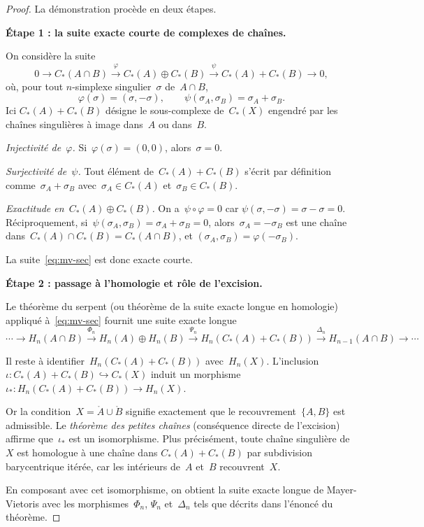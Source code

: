 \documentclass[12pt,a4paper,openany]{book}
\theoremstyle{definition}
\theoremstyle{plain}
\theoremstyle{remark}
\begin{document}
\begin{proof}
La démonstration procède en deux étapes.

\medskip
\noindent\textbf{Étape 1 : la suite exacte courte de complexes de chaînes.}

On considère la suite
\begin{equation}\label{eq:mv-sec}
  0 \longrightarrow C_*(A \cap B)
  \xrightarrow{\;\varphi\;} C_*(A) \oplus C_*(B)
  \xrightarrow{\;\psi\;} C_*(A) + C_*(B) \longrightarrow 0,
\end{equation}
où, pour tout $n$-simplexe singulier~$\sigma$ de~$A \cap B$,
\[
  \varphi(\sigma) = (\sigma, -\sigma),
  \qquad
  \psi(\sigma_A, \sigma_B) = \sigma_A + \sigma_B.
\]
Ici $C_*(A) + C_*(B)$ désigne le sous-complexe de~$C_*(X)$ engendré par les chaînes
singulières à image dans~$A$ ou dans~$B$.

\emph{Injectivité de~$\varphi$.} Si~$\varphi(\sigma) = (0, 0)$, alors~$\sigma = 0$.

\emph{Surjectivité de~$\psi$.} Tout élément de~$C_*(A) + C_*(B)$ s'écrit par
définition comme~$\sigma_A + \sigma_B$ avec~$\sigma_A \in C_*(A)$ et~$\sigma_B \in C_*(B)$.

\emph{Exactitude en~$C_*(A) \oplus C_*(B)$.} On a~$\psi \circ \varphi = 0$ car
$\psi(\sigma, -\sigma) = \sigma - \sigma = 0$. Réciproquement,
si~$\psi(\sigma_A, \sigma_B) = \sigma_A + \sigma_B = 0$, alors~$\sigma_A = -\sigma_B$
est une chaîne dans~$C_*(A) \cap C_*(B) = C_*(A \cap B)$, et
$(\sigma_A, \sigma_B) = \varphi(-\sigma_B)$.

La suite~\eqref{eq:mv-sec} est donc exacte courte.

\medskip
\noindent\textbf{Étape 2 : passage à l'homologie et rôle de l'excision.}

Le théorème du serpent (ou théorème de la suite exacte longue
en homologie) appliqué à~\eqref{eq:mv-sec} fournit une suite exacte longue
\[
  \cdots \to H_n(A \cap B) \xrightarrow{\Phi_n} H_n(A) \oplus H_n(B)
  \xrightarrow{\Psi_n} H_n(C_*(A) + C_*(B)) \xrightarrow{\Delta_n}
  H_{n-1}(A \cap B) \to \cdots
\]

Il reste à identifier~$H_n(C_*(A) + C_*(B))$ avec~$H_n(X)$. L'inclusion
$\iota \colon C_*(A) + C_*(B) \hookrightarrow C_*(X)$ induit un morphisme
$\iota_* \colon H_n(C_*(A) + C_*(B)) \to H_n(X)$.

Or la condition~$X = \mathring{A} \cup \mathring{B}$ signifie exactement que le
recouvrement~$\{A, B\}$ est admissible. Le \emph{théorème des petites chaînes}
(conséquence directe de l'excision) affirme que~$\iota_*$ est un isomorphisme.
Plus précisément, toute chaîne singulière de~$X$ est homologue à une chaîne dans
$C_*(A) + C_*(B)$ par subdivision barycentrique
itérée, car les intérieurs de~$A$ et~$B$ recouvrent~$X$.

En composant avec cet isomorphisme, on obtient la suite exacte longue de
Mayer-Vietoris avec les morphismes~$\Phi_n$, $\Psi_n$ et~$\Delta_n$ tels que
décrits dans l'énoncé du théorème.
\end{proof}
\end{document}

